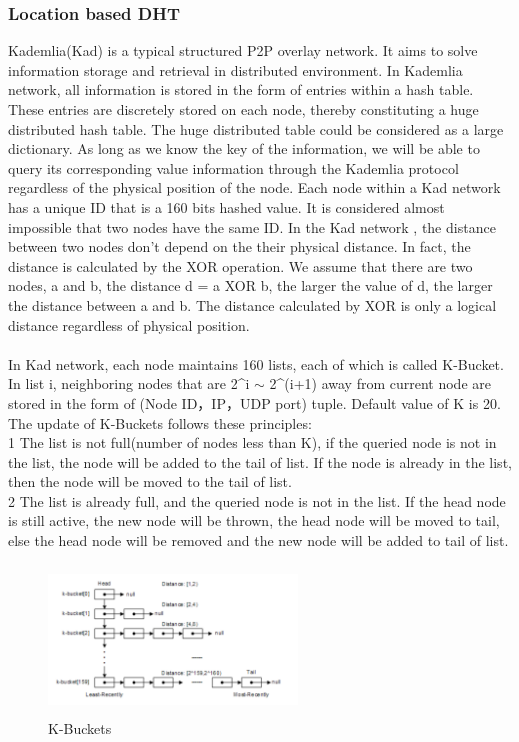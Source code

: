 \documentclass[12pt,oneside,a4paper]{article}
\begin{document}
\subsubsection{Location based DHT}
Kademlia(Kad) is a typical structured P2P overlay network. It aims to solve information storage and retrieval in distributed environment. In Kademlia network, all information is stored in the form of entries within a hash table. These entries are discretely stored on each node, thereby constituting a huge distributed hash table. The huge distributed table could be considered as a large dictionary. As long as we know the key of the information, we will be able to query its corresponding value information through the Kademlia protocol regardless of the physical position of the node. Each node within a Kad network has a unique ID that is a 160 bits hashed value. It is considered almost impossible that two nodes have the same ID. In the Kad network , the distance between two nodes don't depend on the their physical distance. In fact, the distance is calculated by the XOR operation. We assume that there are two nodes, a and b, the distance d = a XOR b, the larger the value of d, the larger the distance between a and b. The distance calculated by XOR is only a logical distance regardless of physical position.\\\\
In Kad network, each node maintains 160 lists, each of which is called K-Bucket. In list i, neighboring nodes that are 2\^{}i $\sim$ 2\^{}(i+1) away from current node are stored in the form of (Node ID，IP，UDP port) tuple. Default value of K is 20. \\
The update of K-Buckets follows these principles:\\
1 The list is not full(number of nodes less than K), if the queried node is not in the list, the node will be added to the tail of list. If the node is already in the list, then the node will be moved to the tail of list.\\
2 The list is already full, and the queried node is not in the list. If the head node is still active, the new node will be thrown, the head node will be moved to tail, else the head node will be removed and the new node will be added to tail of list.
\begin{figure}[htb]
\centering
\includegraphics[width=250px, height=150px]{kbucket.png}
\caption{K-Buckets}
\label{picture-label001}
\end{figure}
\end{document}
